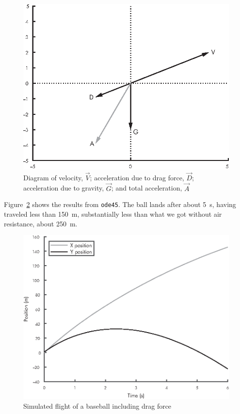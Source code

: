 \begin{figure}[h]
\centerline{\includegraphics[scale=0.8]{images/figure12_03_new.eps}}
\caption{Diagram of velocity, $\vec{V}$; acceleration due to drag force, 
$\vec{D}$; acceleration due to gravity, $\vec{G}$; and total acceleration, $\vec{A}$}
\label{fig:vector3}
\end{figure}


Figure~\ref{fig:baseball2} shows the results from \lstinline{ode45}.  The ball lands after about \SI{5}{\second}, having traveled less than \SI{150}{\meter}, substantially less than what we got without air resistance, about \SI{250}{\meter}.

\begin{figure}[h]
\centerline{\includegraphics[scale=0.8]{images/figure12_04_new.eps}}
\caption{Simulated flight of a baseball including drag force}
\label{fig:baseball2}
\end{figure}


